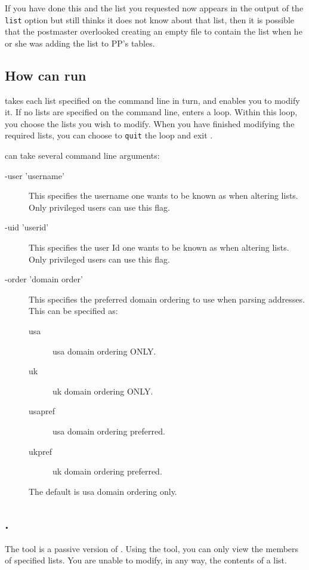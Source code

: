 If you have done this and the list you requested now appears in the
output of the \verb+list+ option but  still thinks it does
not know 
about that list, then it is possible that the postmaster overlooked
creating an empty file to contain the list when he or she was adding
the list to PP's tables.

\subsection	{How  can run}

 takes each list specified on the command line in turn, and
enables you to modify it.
If no lists are specified on the command line,  enters a loop.
Within this loop, you choose the lists you wish to modify.
When you have finished modifying the required lists, you can choose to
{\tt quit} the loop and exit .

 can take several command line arguments:
\begin{description}

\item [-user 'username'] This specifies the username one wants to be
known as when altering lists. Only privileged users can use this flag.

\item [-uid 'userid'] This specifies the user Id one wants to be known
as when altering lists. Only privileged users can use this flag.

\item [-order 'domain order'] This specifies the preferred domain
ordering to use when parsing addresses. This can be specified as:
\begin{description}
\item [usa] usa domain ordering ONLY.
\item [uk] uk domain ordering ONLY.
\item [usapref] usa domain ordering preferred.
\item [ukpref] uk domain ordering preferred.
\end{description}
The default is usa domain ordering only.
\end{description}

\subsection	{.}

The  tool is a passive version of .
Using the  tool, you can only view the members of specified lists.
You are unable to modify, in any way, the contents of a list.

